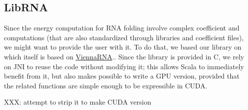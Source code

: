 \subsection{LibRNA}
Since the energy computation for RNA folding involve complex coefficient and computations (that are also standardized through libraries and coefficient files), we might want to provide the user with it. To do that, we based our library on \cite{gapc_thesis} which itself is based on \href{http://www.tbi.univie.ac.at/~ivo/RNA/}{ViennaRNA}.\cite{vienna_rna}. Since the library is provided in C, we rely on JNI to reuse the code without modifying it; this allows Scala to immediately benefit from it, but also makes possible to write a GPU version, provided that the related functions are simple enough to be expressible in CUDA.

{\color{red}
XXX: attempt to strip it to make CUDA version
}
